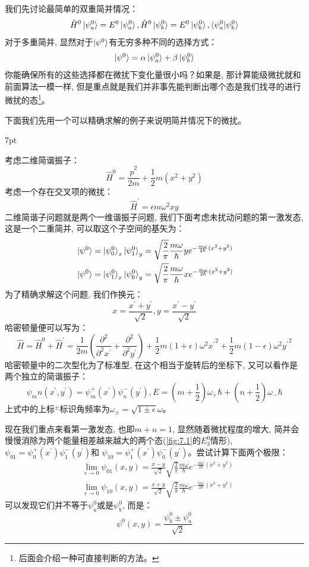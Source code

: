 \documentclass[a4paper,zihao=-4,linespread=1]{ctexrep}
\newenvironment{thinknote}{%
\def\FrameCommand{%
\hspace{1pt}%
{\color{BurlyWood}\vrule width 2pt}%
{\color{formalshade}\vrule width 4pt}%
\colorbox{formalshade}%
}%
\MakeFramed{\advance\hsize-\width\FrameRestore}%
\noindent\hspace{-4.55pt}%
\begin{adjustwidth}{}{7pt}%
\vspace{2pt}\vspace{2pt}%
}
{%
\vspace{2pt}\end{adjustwidth}\endMakeFramed%
}
\begin{document}
    我们先讨论最简单的双重简并情况：
    \[\hat{H}^0\ket{\psi_a^0}=E^0\ket{\psi_a^0},\hat{H}^0\ket{\psi_b^0}=E^0\ket{\psi_b^0}, \braket{\psi_a^0|\psi_b^0}\]
    对于多重简并, 显然对于$\ket{\psi^0}$有无穷多种不同的选择方式：
    \[\ket{\psi^0}=\alpha\ket{\psi_a^0}+\beta\ket{\psi_b^0}\]
    你能确保所有的这些选择都在微扰下变化量很小吗？如果是, 那计算能级微扰就和前面算法一模一样, 但是重点就是我们并非事先能判断出哪个态是我们找寻的进行微扰的态\footnote{后面会介绍一种可直接判断的方法。}。

    下面我们先用一个可以精确求解的例子来说明简并情况下的微扰。
    \begin{thinknote}
        考虑二维简谐振子：
        \[\hat{H}^0=\frac{\hat{p}^2}{2m}+\frac{1}{2}m\left(x^2+y^2\right)\]
        考虑一个存在交叉项的微扰：
        \[\hat{H}^\prime=\epsilon m \omega^2 xy\]
        二维简谐子问题就是两个一维谐振子问题, 我们下面考虑未扰动问题的第一激发态, 这是一个二重简并, 可以取这个子空间的基矢为：
        \begin{align*}
            &\ket{\psi^0}=\ket{\psi^0_0}_x\ket{\psi_1^0}_y=\sqrt{\frac{2}{\pi}}\frac{m\omega}{\hbar}y e^{-\frac{m \omega}{2\hbar}(x^2+y^2)}\\
            &\ket{\psi^0}=\ket{\psi^0_1}_x\ket{\psi_0^0}_y=\sqrt{\frac{2}{\pi}}\frac{m\omega}{\hbar}x e^{-\frac{m \omega}{2\hbar}(x^2+y^2)}
        \end{align*}
        为了精确求解这个问题, 我们作换元：
        \[x=\frac{x^\prime+y^\prime}{\sqrt{2}},y=\frac{x^\prime-y^\prime}{\sqrt{2}}\]
        哈密顿量便可以写为：
        \[\hat{H}=\hat{H}^0+\hat{H}^\prime=\frac{1}{2m}\left(\frac{\partial^2}{\partial^2 x^\prime}+\frac{\partial^2}{\partial^2 y^\prime}\right)+\frac{1}{2}m(1+\epsilon)\omega^2 {x^\prime}^2+\frac{1}{2}m(1-\epsilon)\omega^2{y^\prime}^2\]
        哈密顿量中的二次型化为了标准型, 在这个相当于旋转后的坐标下, 又可以看作是两个独立的简谐振子：
        \[\psi_mn(x^\prime,y^\prime)=\psi^+_m(x^\prime)\psi^-_n(y^\prime),E=\left(m+\frac{1}{2}\right)\omega_+\hbar+\left(n+\frac{1}{2}\right)\omega_-\hbar\]
        上式中的上标$^\pm$标识角频率为$\omega_\pm=\sqrt{1\pm\epsilon}\omega$。

        \setlength\parindent{2em}现在我们重点来看第一激发态, 也即$m+n=1$, 显然随着微扰程度的增大, 简并会慢慢消除为两个能量相差越来越大的两个态(\ref{fig:7.1}的$E_3^0$情形), $\psi_{01}=\psi^+_0(x^\prime)\psi^-_1(y^\prime)$和
        $\psi_{10}=\psi^+_1(x^\prime)\psi^-_0(y^\prime)$。尝试计算下面两个极限：
        \begin{align*}
            &\lim_{\epsilon\to0}\psi_{01}(x,y)=\frac{x-y}{\sqrt{2}}\sqrt{\frac{2}{\pi}}\frac{m\omega}{\hbar} e^{-\frac{m \omega}{2\hbar}(x^2+y^2)}\\
            &\lim_{\epsilon\to0}\psi_{10}(x,y)=\frac{x+y}{\sqrt{2}}\sqrt{\frac{2}{\pi}}\frac{m\omega}{\hbar} e^{-\frac{m \omega}{2\hbar}(x^2+y^2)}
        \end{align*}
        可以发现它们并不等于$\psi^0_a$或是$\psi^0_b$, 而是：
        $$\psi^0(x,y)=\frac{\psi_b^0\pm\psi_a^0}{\sqrt{2}}$$
    \end{thinknote}
\end{document}
